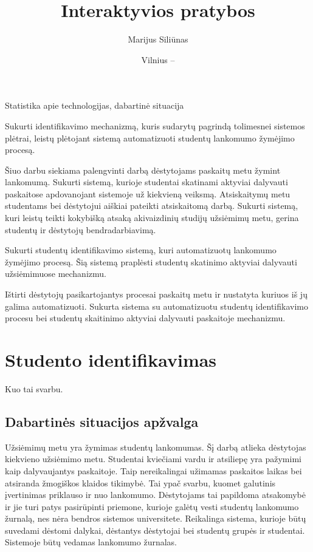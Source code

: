 \documentclass{VUMIFPSkursinis}
\title{Interaktyvios pratybos}
\author{Marijus Siliūnas}
\date{Vilnius – \the\year}
\begin{document}
\maketitle

\tableofcontents


Statistika apie technologijas, dabartinė situacija


Sukurti identifikavimo mechanizmą, kuris sudarytų pagrindą tolimesnei sistemos plėtrai, leistų plėtojant sistemą automatizuoti studentų lankomumo žymėjimo procesą.

Šiuo darbu siekiama palengvinti darbą dėstytojams paskaitų metu žymint lankomumą. Sukurti sistemą, kurioje studentai skatinami aktyviai dalyvauti paskaitose apdovanojant sistemoje už kiekvieną veiksmą. Atsiskaitymų metu studentams bei dėstytojui aiškiai pateikti atsiskaitomą darbą.
Sukurti sistemą, kuri leistų teikti kokybišką atsaką akivaizdinių studijų užsiėmimų metu, gerina studentų ir dėstytojų bendradarbiavimą.


Sukurti studentų identifikavimo sistemą, kuri automatizuotų lankomumo žymėjimo procesą. Šią sistemą praplėsti studentų skatinimo aktyviai dalyvauti užsiėmimuose mechanizmu.

Ištirti dėstytojų pasikartojantys procesai paskaitų metu ir nustatyta kuriuos iš jų galima automatizuoti. Sukurta sistema su automatizuotu studentų identifikavimo procesu bei studentų skaitinimo aktyviai dalyvauti paskaitoje mechanizmu. 

\section{Studento identifikavimas}

Kuo tai svarbu.

\subsection{Dabartinės situacijos apžvalga}

Užsiėmimų metu yra žymimas studentų lankomumas. Šį darbą atlieka dėstytojas kiekvieno užsiėmimo metu. Studentai kviečiami vardu ir atsiliepę yra pažymimi kaip dalyvaujantys paskaitoje. Taip nereikalingai užimamas paskaitos laikas bei atsiranda žmogiškos klaidos tikimybė. Tai ypač svarbu, kuomet galutinis įvertinimas priklauso ir nuo lankomumo. Dėstytojams tai papildoma atsakomybė ir jie turi patys pasirūpinti priemone, kurioje galėtų vesti studentų lankomumo žurnalą, nes nėra bendros sistemos universitete.  Reikalinga sistema, kurioje būtų suvedami dėstomi dalykai, dėstantys dėstytojai bei studentų grupės ir studentai. Sistemoje būtų vedamas lankomumo žurnalas.
\end{document}
